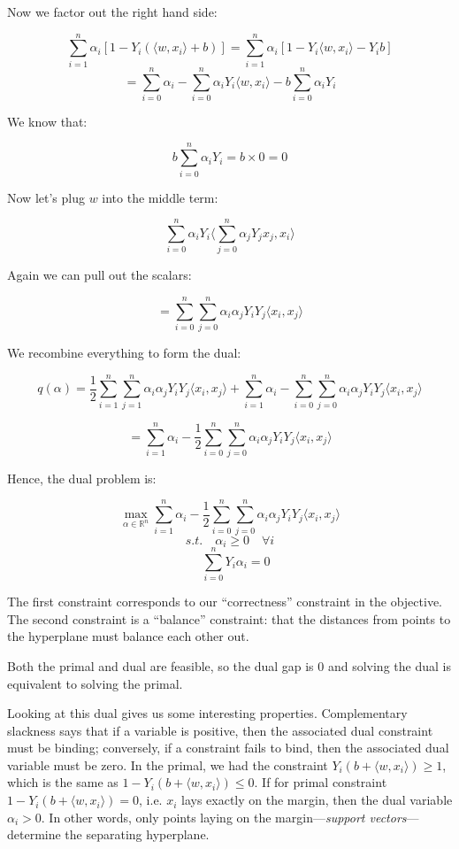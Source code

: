 \documentclass{minimal}
\begin{document}
Now we factor out the right hand side:

$$
\sum_{i=1}^n \alpha_i [1 - Y_i(\langle w, x_i \rangle + b)] = \sum_{i=1}^n
\alpha_i [1 - Y_i \langle w, x_i \rangle - Y_i b]
$$
$$
= \sum_{i=0}^n \alpha_i - \sum_{i=0}^n \alpha_i Y_i \langle w, x_i \rangle -
b \sum_{i=0}^n \alpha_i Y_i
$$

We know that:

$$
b \sum_{i=0}^n \alpha_i Y_i = b \times 0 = 0
$$

Now let's plug $w$ into the middle term:

$$
\sum_{i=0}^n \alpha_i Y_i \langle \sum_{j=0}^n \alpha_j Y_j x_j, x_i \rangle
$$

Again we can pull out the scalars:

$$
= \sum_{i=0}^n \sum_{j=0}^n \alpha_i \alpha_j Y_i Y_j \langle x_i, x_j \rangle
$$

We recombine everything to form the dual:

$$
q(\alpha) = \frac{1}{2} \sum_{i=1}^n \sum_{j=1}^n \alpha_i \alpha_j Y_i Y_j
\langle x_i, x_j \rangle + \sum_{i=1}^n \alpha_i - 
\sum_{i=0}^n \sum_{j=0}^n \alpha_i \alpha_j Y_i Y_j \langle x_i, x_j \rangle
$$

$$
= \sum_{i=1}^n \alpha_i - \frac{1}{2} \sum_{i=0}^n \sum_{j=0}^n \alpha_i \alpha_j Y_i Y_j \langle x_i, x_j \rangle
$$

Hence, the dual problem is:

$$
\max_{\alpha \in \mathbb{R}^n} 
\sum_{i=1}^n \alpha_i - \frac{1}{2} \sum_{i=0}^n \sum_{j=0}^n \alpha_i \alpha_j Y_i Y_j \langle x_i, x_j \rangle
$$
$$
s.t. \quad \alpha_i \geq 0 \quad \forall i
$$
$$
\quad \sum_{i=0}^n Y_i \alpha_i = 0
$$

The first constraint corresponds to our ``correctness'' constraint in the
objective. The second constraint is a ``balance'' constraint: that the distances
from points to the hyperplane must balance each other out.

Both the primal and dual are feasible, so the dual gap is 0 and solving the dual is
equivalent to solving the primal. 

Looking at this dual gives us some interesting properties. Complementary slackness 
says that if a variable is positive,
then the associated dual constraint must be binding; conversely, if a constraint
fails to bind, then the associated dual variable must be zero. In the primal, we
had the constraint $Y_i(b + \langle w, x_i \rangle)\geq 1$, which is the same as
$1 - Y_i(b + \langle w, x_i \rangle) \leq 0$. If for primal constraint $1 - Y_i(b + \langle w, x_i
\rangle) = 0$, i.e. $x_i$ lays exactly on the margin, then the dual variable
$\alpha_i > 0$. In other words, only points laying on the
margin---\textit{support vectors}---determine the
separating hyperplane. 
\end{document}
